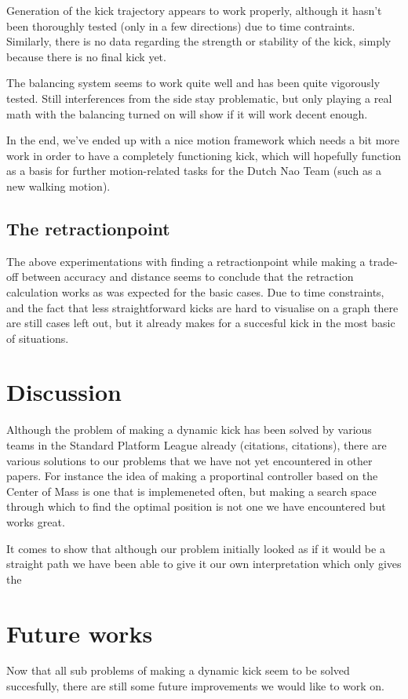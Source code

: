 \documentclass[a4paper]{article}
\begin{document}
Generation of the kick trajectory appears to work properly, although it hasn't
been thoroughly tested (only in a few directions) due to time
contraints. Similarly, there is no data regarding the strength or stability of
the kick, simply because there is no final kick yet.

The balancing system seems to work quite well and has been quite vigorously
tested. Still interferences from the side stay problematic, but only playing a
real math with the balancing turned on will show if it will work decent enough.

In the end, we've ended up with a nice motion framework which needs a bit more
work in order to have a completely functioning kick, which will hopefully function
as a basis for further motion-related tasks for the Dutch Nao Team (such as a
new walking motion).

\subsection{The retractionpoint} 
The above experimentations with finding a retractionpoint while making
a trade-off between accuracy and distance seems to conclude that the
retraction calculation works as was expected for the basic cases. Due
to time constraints, and the fact that less straightforward kicks are
hard to visualise on a graph there are still cases left out, but it
already makes for a succesful kick in the most basic of situations.

\section{Discussion}
Although the problem of making a dynamic kick has been solved by various teams
in the Standard Platform League already (citations, citations), there are various solutions to our
problems that we have not yet encountered in other papers. For instance the idea
of making a proportinal controller based on the Center of Mass is one that is
implemeneted often, but making a search space through which to find the optimal
position is not one we have encountered but works great.

It comes to show that although our problem initially looked as if it would be a
straight path we have been able to give it our own interpretation which only
gives the 

\section{Future works}
Now that all sub problems of making a dynamic kick seem to be solved succesfully, there are still some future improvements we would like to work on.
\end{document}
